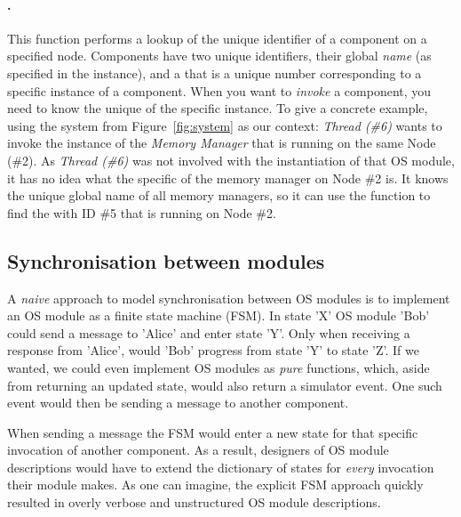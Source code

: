 \paragraph{.}
This function performs a lookup of the unique identifier of a component on a specified node.
Components have two unique identifiers, their global \emph{name} (as specified in the  instance), and a  that is a unique number corresponding to a specific instance of a component.
When you want to \emph{invoke} a component, you need to know the unique  of the specific instance.
To give a concrete example, using the system from Figure~\ref{fig:system} as our context: \emph{Thread (\#6)} wants to invoke the instance of the \emph{Memory Manager} that is running on the same Node (\#2).
As \emph{Thread (\#6)} was not involved with the instantiation of that OS module, it has no idea what the specific  of the memory manager on Node \#2 is.
It knows the unique global name of all memory managers, so it can use the  function to find the  with ID \#5 that is running on Node \#2.

\subsection{Synchronisation between modules}
A \emph{naive} approach to model synchronisation between OS modules is to implement an OS module as a finite state machine (FSM).
In state 'X' OS module 'Bob' could send a message to 'Alice' and enter state 'Y'.
Only when receiving a response from 'Alice', would 'Bob' progress from state 'Y' to state 'Z'.
If we wanted, we could even implement OS modules as \emph{pure} functions, which, aside from returning an updated state, would also return a simulator event.
One such event would then be sending a message to another component.

When sending a message the FSM would enter a new state for that specific invocation of another component.
As a result, designers of OS module descriptions would have to extend the dictionary of states for \emph{every} invocation their module makes.
As one can imagine, the explicit FSM approach quickly resulted in overly verbose and unstructured OS module descriptions.

